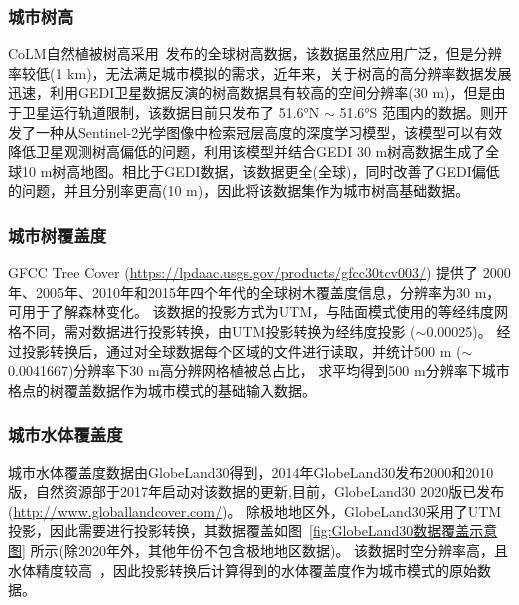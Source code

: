 \subsubsection{城市树高}\label{城市树高数据}
CoLM自然植被树高采用~\citet{simard2011mapping}发布的全球树高数据，该数据虽然应用广泛，但是分辨率较低(1 km)，无法满足城市模拟的需求，近年来，关于树高的高分辨率数据发展迅速，\citet{potapov2021mapping}利用GEDI卫星数据反演的树高数据具有较高的空间分辨率(30 m)，但是由于卫星运行轨道限制，该数据目前只发布了 \ang{51.6;;}N $\sim$ \ang{51.6;;}S 范围内的数据。\citet{lang2023high}则开发了一种从Sentinel-2光学图像中检索冠层高度的深度学习模型，该模型可以有效降低卫星观测树高偏低的问题，\citet{lang2023high}利用该模型并结合GEDI 30 m树高数据生成了全球10 m树高地图。相比于GEDI数据，该数据更全(全球)，同时改善了GEDI偏低的问题，并且分别率更高(10 m)，因此将该数据集作为城市树高基础数据。

\subsubsection{城市树覆盖度}
GFCC Tree Cover (\url{https://lpdaac.usgs.gov/products/gfcc30tcv003/}) 提供了
2000年、2005年、2010年和2015年四个年代的全球树木覆盖度信息，分辨率为30 m，可用于了解森林变化。
该数据的投影方式为UTM，与陆面模式使用的等经纬度网格不同，需对数据进行投影转换，由UTM投影转换为经纬度投影 ($\sim$0.00025\textdegree)。
经过投影转换后，通过对全球数据每个区域的文件进行读取，并统计500 m 
 ($\sim$0.0041667\textdegree)分辨率下30 m高分辨网格植被总占比，
求平均得到500 m分辨率下城市格点的树覆盖数据作为城市模式的基础输入数据。

\subsubsection{城市水体覆盖度}\label{城市水体覆盖度}
城市水体覆盖度数据由GlobeLand30得到，2014年GlobeLand30发布2000和2010版，自然资源部于2017年启动对该数据的更新,目前，GlobeLand30 2020版已发布 (\url{http://www.globallandcover.com/})。
除极地地区外，GlobeLand30采用了UTM投影，因此需要进行投影转换，其数据覆盖如图~\ref{fig:GlobeLand30数据覆盖示意图} 所示(除2020年外，其他年份不包含极地地区数据)。
该数据时空分辨率高，且水体精度较高~\citep{chen2015global}，因此投影转换后计算得到的水体覆盖度作为城市模式的原始数据。

